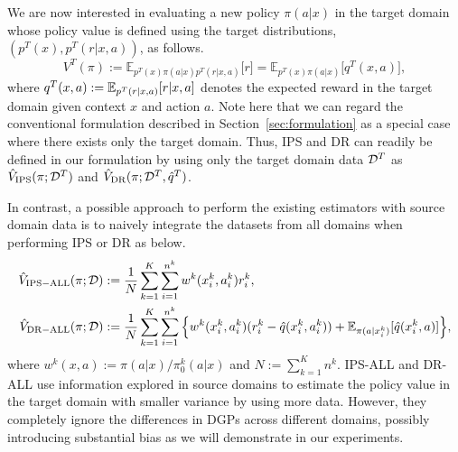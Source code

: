 \documentclass{article} %
\theoremstyle{definition}
\begin{document}
We are now interested in evaluating a new policy $\pi(a | x)$ in the target domain whose policy value is defined using the target distributions, $(p^T(x), p^T(r|x,a))$, as follows.
\begin{equation}
    \label{policy value multi}
    V^T(\pi):= \mathbb {E}_{p^T(x)\pi(a|x)p^T(r|x,a)}\lbrack r\rbrack=\mathbb {E}_{p^T(x)\pi(a|x)}\lbrack q^T(x,a)\rbrack,
\end{equation}
where $q^T(x, a) := \mathbb{E}_{p^T(r|x,a)}\lbrack r|x, a\rbrack$ denotes the expected reward in the target domain given context $x$ and action $a$. Note here that we can regard the conventional formulation described in Section~\ref{sec:formulation} as a special case where there exists only the target domain. Thus, IPS and DR can readily be defined in our formulation by using only the target domain data $\mathcal{D}^T$ as $\hat{V}_{\rm{IPS}}(\pi;\mathcal{D}^T)$ and $\hat{V}_{\rm{DR}}(\pi;\mathcal{D}^T,\hat{q}^T)$. 

In contrast, a possible approach to perform the existing estimators with source domain data is to naively integrate the datasets from all domains when performing IPS or DR as below.
\begin{align}
    \hat{V}_{\rm{IPS-ALL}}(\pi;\mathcal{D})
    &:=\frac{1}{N}\sum_{k=1}^K\sum_{i=1}^{n^{k}}w^{k}(x_{i}^{k},a_{i}^{k})r_{i}^{k}, \label{eq:ips-all} \\
    \displaystyle \hat{V}_{\rm{DR-ALL}}(\pi;\mathcal{D})
    &:=\frac{1}{N} \sum_{k=1}^K\sum_{i=1}^{n^{k}} \Big\{w^{k}(x_{i}^{k},a_{i}^{k})(r_{i}^{k}-\hat{q}(x_{i}^{k},a_{i}^{k}))+ \mathbb{E}_{\pi(a|x_i^k)}\lbrack \hat{q}(x_i^k,a) \rbrack \Big\}, \label{eq:dr-all}
\end{align}
where $w^{k}(x,a):=\pi(a|x) / \pi_0^{k}(a|x)$ and $N:=\sum_{k=1}^K n^{k}$. 
IPS-ALL and DR-ALL use information explored in source domains to estimate the policy value in the target domain with smaller variance by using more data. However, they completely ignore the differences in DGPs across different domains, possibly introducing substantial bias as we will demonstrate in our experiments.
\end{document}
